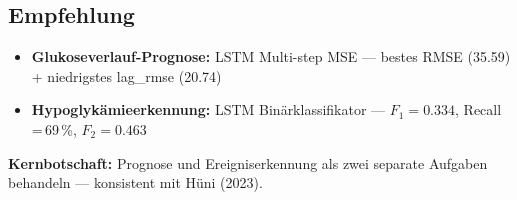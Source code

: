 \documentclass[a4paper,10pt]{article}
\begin{document}
\subsection*{Empfehlung}

\begin{itemize}[nosep, leftmargin=1.5em]
\item \textbf{Glukoseverlauf-Prognose:} LSTM Multi-step MSE --- bestes RMSE (35.59) + niedrigstes lag\_rmse (20.74)
\item \textbf{Hypoglykämieerkennung:} LSTM Binärklassifikator --- $F_1{=}0.334$, Recall\,=\,69\,\%, $F_2{=}0.463$
\end{itemize}

\medskip
\noindent\textbf{Kernbotschaft:} Prognose und Ereigniserkennung als zwei separate Aufgaben behandeln --- konsistent mit Hüni (2023).
\end{document}
